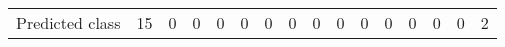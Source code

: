 \documentclass[12pt]{article}
\begin{document}
\begin{enumerate}
\begin{table}[H]
\begin{tabular}{@{}llllllllllllllll@{}}
\multirow{-14}{*}{\cellcolor[HTML]{34FF34}Predicted class} & \cellcolor[HTML]{34FF34}15 & 0                         & 0                         & 0                         & 0                         & 0                         & 0                         & 0                         & 0                         & 0                          & 0                          & 0                          & 0                          & 0                          & 2                          \\ \cmidrule(l){2-16} 
\end{tabular}
\end{table}

\end{enumerate}
\end{document}
